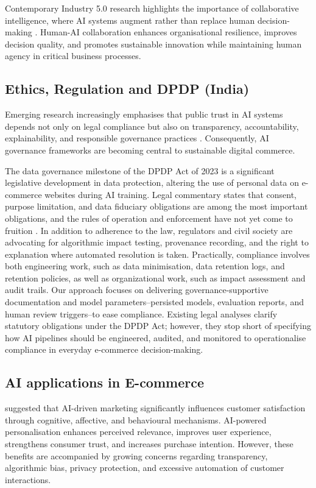 \documentclass[authoryear,review,3p,times,12pt]{elsarticle}
\begin{document}
Contemporary Industry 5.0 research highlights the importance of collaborative intelligence, where AI systems augment rather than replace human decision-making \citep{BALOGUN2026100027}. Human-AI collaboration enhances organisational resilience, improves decision quality, and promotes sustainable innovation while maintaining human agency in critical business processes.

\subsection{Ethics, Regulation and DPDP (India)}
Emerging research increasingly emphasises that public trust in AI systems depends not only on legal compliance but also on transparency, accountability, explainability, and responsible governance practices \citep{RAHMAN2026100020}. Consequently, AI governance frameworks are becoming central to sustainable digital commerce.

The data governance milestone of the DPDP Act of 2023 is a significant legislative development in data protection, altering the use of personal data on e-commerce websites during AI training. Legal commentary states that consent, purpose limitation, and data fiduciary obligations are among the most important obligations, and the rules of operation and enforcement have not yet come to fruition \citep{Sundara2023129141}. In addition to adherence to the law, regulators and civil society are advocating for algorithmic impact testing, provenance recording, and the right to explanation where automated resolution is taken. Practically, compliance involves both engineering work, such as data minimisation, data retention logs, and retention policies, as well as organizational work, such as impact assessment and audit trails. Our approach focuses on delivering governance-supportive documentation and model parameters–persisted models, evaluation reports, and human review triggers–to ease compliance. Existing legal analyses \citep{Sundara2023129141, Naithani20240174} clarify statutory obligations under the DPDP Act; however, they stop short of specifying how AI pipelines should be engineered, audited, and monitored to operationalise compliance in everyday e-commerce decision-making.

\subsection{AI applications in E-commerce}
\citet{patgiri2026artificial} suggested that AI-driven marketing significantly influences customer satisfaction through cognitive, affective, and behavioural mechanisms. AI-powered personalisation enhances perceived relevance, improves user experience, strengthens consumer trust, and increases purchase intention. However, these benefits are accompanied by growing concerns regarding transparency, algorithmic bias, privacy protection, and excessive automation of customer interactions.
\end{document}
